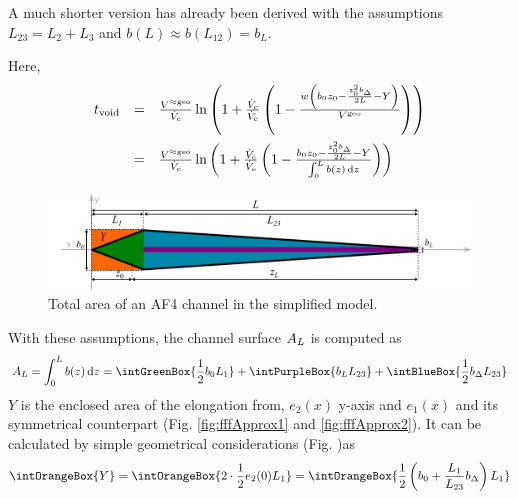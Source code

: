 A much shorter version has already been derived  with the assumptions $L_{23} = L_2 
+ L_3$ and $b(L) \approx b(L_{12}) = b_L$.

Here, 
\begin{equation}
\begin{array}{lll}
\tvoid &= & \frac{\Vappgeo}{\Vc} \ln{
  \left(
  1 + \frac{\Vc}{\Ve}
  \left(
  1 - \frac{
    w 
    \left(
    b_0 z_0 
    - \frac{
      z_0^2 \bDelta
    }{
      2L} 
    - Y
    \right)
  }{\Vgeo}
  \right)
  \right)}
\\\addlinespace
&= &\frac{\Vappgeo}{\Vc} \ln{
  \left(
  1 + \frac{\Vc}{\Ve}
  \left(
  1 - \frac{
    b_0 z_0 
    - \frac{
      z_0^2 \bDelta
    }{
      2L
    } 
    -  Y
  }{
 \int_{0}^{L} b(z) \diff z 
}
  \right)
  \right)}
\end{array}
\end{equation}
\begin{figure}[H]
  \begin{center}
    \includegraphics[width=\linewidth]{./images/fffSimplified.pdf}
    \vspace*{-3ex}    
  \end{center}
  \caption[Total area of an AF4 channel in the simplified model]{
    Total area of an AF4 channel in the simplified model.}
  \label{fig:fffSimplied}
\end{figure}
With these assumptions, the channel surface $A_L$ is computed as
\begin{equation}
\AL = \int_{0}^{L} b(z) \diff z 
= 
\intGreenBox{\ensuremath{\frac{1}{2} b_0 L_1}}
+ 
\intPurpleBox{\ensuremath{\bL L_{23}}}
+
\intBlueBox{\ensuremath{\frac{1}{2} \bDelta L_{23}}}
\end{equation}
$Y$ is the enclosed area of the elongation from,
$e_2(x)$ y-axis and $e_1(x)$ and its symmetrical counterpart 
(Fig. \ref{fig:fffApprox1} and \ref{fig:fffApprox2}). 
It can be calculated by simple geometrical considerations (Fig. )as 
\begin{equation}
\intOrangeBox{\ensuremath{Y}} = \intOrangeBox{\ensuremath{ 2 \cdot \frac{1}{2} e_2(0) L_1 }} = 
\intOrangeBox{\ensuremath{ \frac{1}{2}\left( b_0 + \frac{L_1}{L_{23}} \bDelta \right) L_1 }}
\end{equation}

